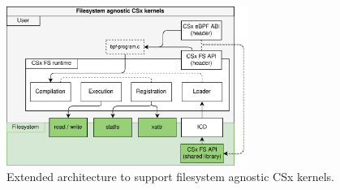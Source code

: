 

\begin{figure}
    \centering
	\includegraphics[width=0.7\textwidth]{resources/images/csx-fs-agnostic.png}
	\caption{Extended architecture to support filesystem agnostic CSx kernels.}
    \label{figure:csxfsruntime}
\end{figure}


